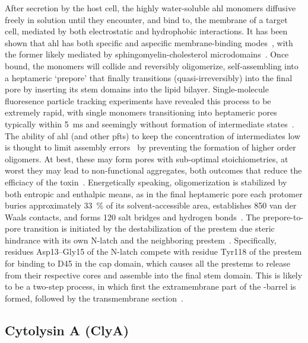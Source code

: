 After secretion by the host cell, the highly water-soluble \gls{ahl} monomers diffusive freely in solution
until they encounter, and bind to, the membrane of a target cell, mediated by both electrostatic and
hydrophobic interactions. It has been shown that \gls{ahl} has both specific and aspecific membrane-binding
modes~\cite{Hildebrand-1991}, with the former likely mediated by sphingomyelin-cholesterol
microdomains~\cite{Valeva-2006}. Once bound, the monomers will collide and reversibly oligomerize,
self-assembling into a heptameric `prepore' that finally transitions (quasi-irreversibly) into the final pore
by inserting its stem domains into the lipid bilayer. Single-molecule
fluoresence particle tracking experiments have revealed this process to be extremely rapid, with single
monomers transitioning into heptameric pores typically within \SI{5}{\ms} and seemingly without formation of
intermediate states~\cite{Thompson-2011}. The ability of \gls{ahl} (and other \glspl{pft}) to keep the
concentration of intermediates low is thought to limit assembly errors~\cite{Lee-2016b} by preventing the
formation of higher order oligomers. At best, these may form pores with sub-optimal stoichiometries, at worst
they may lead to non-functional aggregates, both outcomes that reduce the efficiacy of the
toxin~\cite{Fahie-2013,Subburaj-2015}. Energetically speaking, oligomerization is stabilized by
both entropic and enthalpic means, as in the final heptameric pore each protomer buries approximately
\SI{33}{\percent} of its solvent-accessible area, establishes 850 van der Waals contacts, and forms 120 salt
bridges and hydrogen bonds~\cite{Song-1996}. The prepore-to-pore transition is initiated by the
destabilization of the prestem due steric hindrance with its own N-latch and the neighboring
prestem~\cite{Sugawara-2015}. Specifically, residues Asp13--Gly15 of the N-latch compete with residue Tyr118
of the prestem for binding to D45 in the cap domain, which causes all the prestems to release from their
respective cores and assemble into the final stem domain. This is likely to be a two-step process, in which
first the extramembrane part of the \tb-barrel is formed, followed by the transmembrane
section~\cite{Sugawara-2015}.



\subsection{Cytolysin A (ClyA)}
%
\label{sec:np:clya}
%

